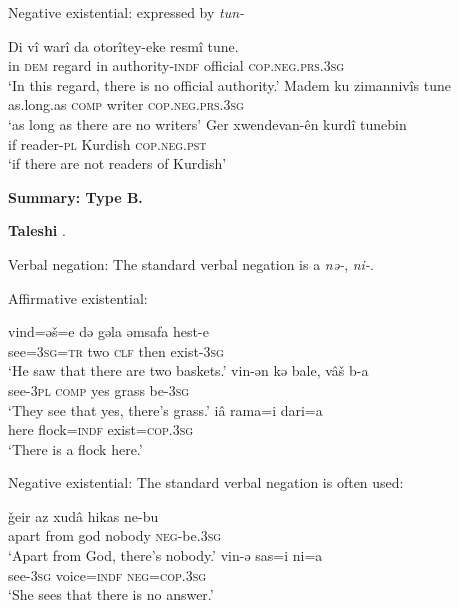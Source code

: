 \documentclass[output=paper]{langsci/langscibook}
\begin{document}
\begin{unindented}
Negative existential: expressed by \textit{tun-} 
%
\begin{exe}\ex \gll Di vî warî    da otorîtey-eke resmî   tune.  \\
in  \textsc{dem}    regard in  authority-\textsc{indf}  official \textsc{cop.neg.prs.3sg} \\
    \glt `In this regard, there is no official authority.' \citep[32]{Thackston2006}
\ex \gll Madem ku zimannivîs tune \\
as.long.as  \textsc{comp}    writer \textsc{cop.neg.prs.3sg} \\
    \glt `as long as there are no writers' \citep[32]{Thackston2006}
\ex \gll Ger xwendevan-ên kurdî tunebin \\
if reader-\textsc{pl} Kurdish  \textsc{cop.neg.pst} \\
    \glt `if there are not readers of Kurdish' \citep[31]{Thackston2006}
    \end{exe}

\textbf{Summary: Type B.}

\textbf{Taleshi} \parencite{Paul2011}. 

Verbal negation: The standard verbal negation is a \textit{nə-}, \textit{ni-}.

Affirmative existential:
%
\begin{exe}\ex
    \gll vind=əš=e də   gəla əmsafa hest-e \\
see=\textsc{3sg}=\textsc{tr} two \textsc{clf} then exist-\textsc{3sg} \\
    \glt `He saw that there are two baskets.' \citep[358]{Paul2011}
\ex \gll vin-ən kə bale, vâš    b-a \\
see-\textsc{3pl} \textsc{comp}     yes   grass be-\textsc{3sg} \\
    \glt `They see that yes, there's grass.' \citep[210]{Paul2011}
\ex \gll iâ rama=i dari=a \\
here flock=\textsc{indf} exist=\textsc{cop.3sg} \\
    \glt `There is a flock here.' \citep[243]{Paul2011}
    \end{exe}

Negative existential: The standard verbal negation is often used:
%
\begin{exe}\ex \gll ǧeir   az   xudâ hikas    ne-bu \\
apart  from  god   nobody \textsc{neg}-be.\textsc{3sg} \\
    \glt `Apart from God, there's nobody.' \citep[176]{Paul2011}
\ex \gll vin-ə sas=i ni=a \\
see-\textsc{3sg} voice=\textsc{indf}  \textsc{neg=cop.3sg} \\
    \glt `She sees that there is no answer.' \citep[422]{Paul2011}
    \end{exe}


\end{unindented}
\end{document}
